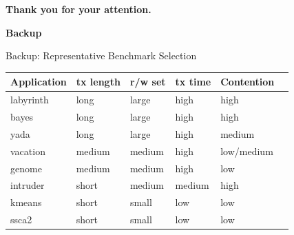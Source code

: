 \documentclass[aspectratio=169, usenames, dvipsnames]{beamer}
\begin{document}
\begin{frame}
  \centering
  \huge
  \alert{\textbf{Thank you for your attention.}}
\end{frame}


\begin{frame}
  \centering
  \huge
  \alert{\textbf{Backup}}
\end{frame}

\begin{frame}{Backup: Representative Benchmark Selection}
    \centering
    \begin{tabular}{|l|l|l|l|l|l|}
        \hline
        \textbf{Application} & \textbf{tx length} & \textbf{r/w set} & \textbf{tx time} & \textbf{Contention}\\\hline\hline
        labyrinth & long & large & high & high\\\hline
        bayes & long & large & high & high\\\hline
        yada & long & large & high & medium\\\hline
        vacation & medium & medium & high & low/medium\\\hline
        genome & medium & medium & high & low\\\hline
        intruder & short & medium & medium & high\\\hline
        kmeans & short & small & low & low\\\hline
        ssca2 & short & small & low & low\\\hline
    \end{tabular}
\end{frame}
\end{document}
